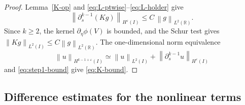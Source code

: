 \documentclass[11pt,reqno]{amsart}
\theoremstyle{plain}
\theoremstyle{definition}
\numberwithin{equation}{section}
\newcommand{\p}{\partial}
\newcommand{\norm}[1]{\left\lVert #1 \right\rVert}
\newcommand{\R}{\mathbb{R}}
\newcommand{\hi}[1]{H^{#1}(I)}
\begin{document}
\begin{proof}
\noindent
Lemma~\ref{K-op} and \eqref{eq:L-ptwise}--\eqref{eq:L-holder} give
\begin{equation}\label{eq:step1-bound}
    \norm{\p_s^{k-1}(K g)}_{\hi{\varepsilon}} \le C\,\norm{g}_{L^2(\R)}.
\end{equation}
Since $k\ge2$, the kernel $\p_\eta\phi(V)$ is bounded, and the
Schur test gives
$\norm{K g}_{L^2(I)}\le C\norm{g}_{L^2(\R)}$.
The one-dimensional norm equivalence
\begin{equation}
    \norm{u}_{H^{k-1+\varepsilon}(I)}
    \simeq \norm{u}_{L^2(I)}
    +\norm{\p_s^{k-1}u}_{H^\varepsilon(I)}
\end{equation}
and \eqref{eq:step1-bound} give \eqref{eq:K-bound}.
\end{proof}

\subsection{Difference estimates for the nonlinear terms}
\label{app:nonlinear-estimates}
\end{document}
